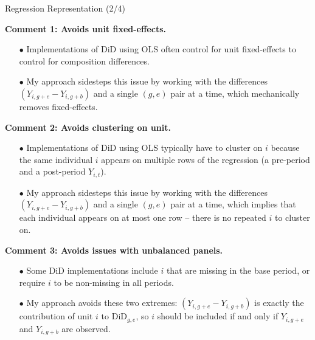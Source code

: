 \documentclass[usenames,dvipsnames]{beamer}
\begin{document}
\begin{frame}{Regression Representation (2/4)}

\vspace{-0.05cm}

\textbf{Comment 1: Avoids unit fixed-effects.}  
\vspace{-0.11cm}
\begin{itemize}
\item[$\bullet$] Implementations of DiD using OLS often control for unit fixed-effects to control for composition differences. 
\item[$\bullet$] My approach sidesteps this issue by working with the differences $(Y_{i,g+e} - Y_{i,g+b})$ and a single $(g,e)$ pair at a time, which mechanically removes fixed-effects.
\end{itemize}

\vspace{-0.08cm}

\textbf{Comment 2: Avoids clustering on unit.}  
\vspace{-0.11cm}
\begin{itemize}
\item[$\bullet$] Implementations of DiD using OLS typically have to cluster on $i$ because the same individual $i$ appears on multiple rows of the regression (a pre-period and a post-period $Y_{i,t}$).
\item[$\bullet$] My approach sidesteps this issue by working with the differences $(Y_{i,g+e} - Y_{i,g+b})$ and a single $(g,e)$ pair at a time, which implies that each individual appears on at most one row -- there is no repeated $i$ to cluster on.
\end{itemize}

\vspace{-0.08cm}

\textbf{Comment 3: Avoids issues with unbalanced panels.}  
\vspace{-0.11cm}
\begin{itemize}
\item[$\bullet$] Some DiD implementations include $i$ that are missing in the base period, or require $i$ to be non-missing in all periods.
\item[$\bullet$] My approach avoids these two extremes: $(Y_{i,g+e} - Y_{i,g+b})$ is exactly the contribution of unit $i$ to $\text{DiD}_{g,e}$, so $i$ should be included if and only if $Y_{i,g+e}$ and $Y_{i,g+b}$ are observed.
\end{itemize}

\vspace{-0.05cm}

\end{frame}
\end{document}
